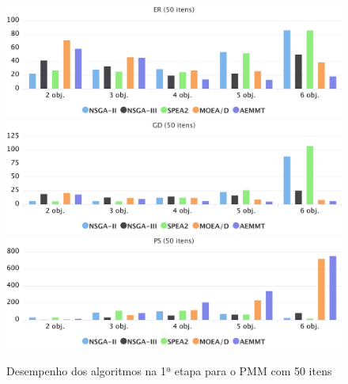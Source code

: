 \begin{figure}[!htbp]
	\includegraphics[width=1\textwidth]{cap_experimentos/figs/etapa1/er-mkp-50}
	\includegraphics[width=1\textwidth]{cap_experimentos/figs/etapa1/gd-mkp-50}
	\includegraphics[width=1\textwidth]{cap_experimentos/figs/etapa1/ps-mkp-50}
	\caption{\label{fig_exp1_pmm_50}Desempenho dos algoritmos na 1ª etapa para o PMM com 50 itens}
\end{figure}

